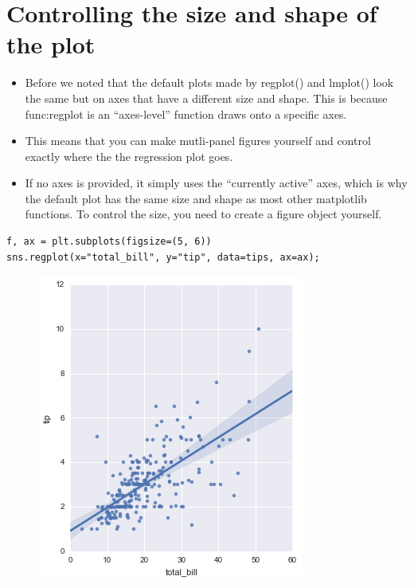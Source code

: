 \documentclass{beamer}
\begin{document}
\section{Controlling the size and shape of the plot}
\begin{frame}[fragile]
	\begin{itemize}
\item Before we noted that the default plots made by regplot() and lmplot() look the same but on axes that have a different size and shape. This is because func:regplot is an “axes-level” function draws onto a specific axes.
\item  This means that you can make mutli-panel figures yourself and control exactly where the the regression plot goes. 
\item If no axes is provided, it simply uses the “currently active” axes, which is why the default plot has the same size and shape as most other matplotlib functions. To control the size, you need to create a figure object yourself.
	\end{itemize}

\end{frame}
\begin{frame}[fragile]
\begin{framed}
\begin{verbatim}
f, ax = plt.subplots(figsize=(5, 6))
sns.regplot(x="total_bill", y="tip", data=tips, ax=ax);
\end{verbatim}
\end{framed}
\begin{figure}
	\centering
	\includegraphics[width=0.7\linewidth]{images/regression_46_0}
\end{figure}
\end{frame}
\end{document}
